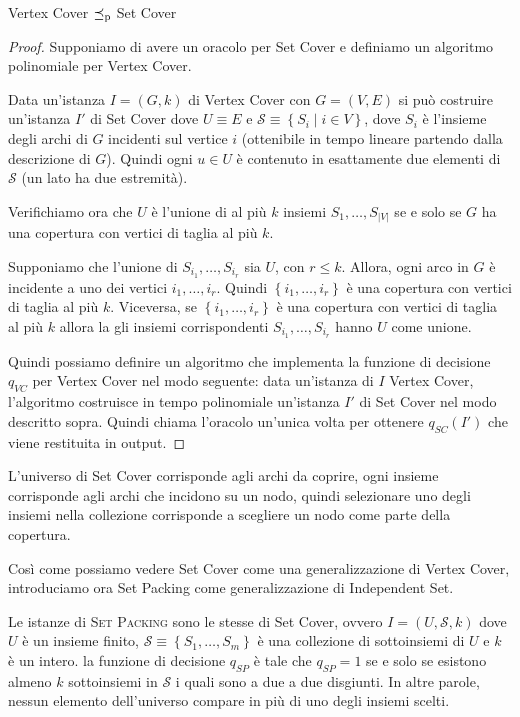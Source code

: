 \begin{fact}
    Vertex Cover $\preceq_\text{p}$ Set Cover
\end{fact}
\begin{proof}
    Supponiamo di avere un oracolo per Set Cover e definiamo un algoritmo polinomiale per Vertex Cover.

    Data un'istanza $I = (G,k)$ di Vertex Cover con $G = (V,E)$ si può costruire un'istanza $I'$ di Set Cover dove $U \equiv E$ e $\mathcal{S} \equiv \left\{S_i \mid i \in V \right\}$, dove $S_i$ è l'insieme degli archi di $G$ incidenti sul vertice $i$ (ottenibile in tempo lineare partendo dalla descrizione di $G$). Quindi ogni $u \in U$ è contenuto in esattamente due elementi di $\mathcal{S}$ (un lato ha due estremità).

    Verifichiamo ora che $U$ è l'unione di al più $k$ insiemi $S_1, \dots, S_{|V|}$ se e solo se $G$ ha una copertura con vertici di taglia al più $k$.

    Supponiamo che l'unione di $S_{i_1}, \dots, S_{i_r}$ sia $U$, con $r \leq k$. Allora, ogni arco in $G$ è incidente a uno dei vertici $i_1, \dots, i_r$. Quindi $\left\{i_1, \dots, i_r\right\}$ è una copertura con vertici di taglia al più $k$. Viceversa, se $\left\{i_1, \dots, i_r\right\}$ è una copertura con vertici di taglia al più $k$ allora la gli insiemi corrispondenti $S_{i_1}, \dots, S_{i_r}$ hanno $U$ come unione.

    Quindi possiamo definire un algoritmo che implementa la funzione di decisione $q_{VC}$ per Vertex Cover nel modo seguente: data un'istanza di $I$ Vertex Cover, l'algoritmo costruisce in tempo polinomiale un'istanza $I'$ di Set Cover nel modo descritto sopra. Quindi chiama l'oracolo un'unica volta per ottenere $q_{SC} (I')$ che viene restituita in output.
\end{proof}

L'universo di Set Cover corrisponde agli archi da coprire, ogni insieme corrisponde agli archi che incidono su un nodo, quindi selezionare uno degli insiemi nella collezione corrisponde a scegliere un nodo come parte della copertura.

Così come possiamo vedere Set Cover come una generalizzazione di Vertex Cover, introduciamo ora Set Packing come generalizzazione di Independent Set.

Le istanze di \textsc{Set Packing} sono le stesse di Set Cover, ovvero $I = (U, \mathcal{S}, k)$ dove $U$ è un insieme finito, $\mathcal{S} \equiv \left\{S_1, \dots, S_m \right\}$ è una collezione di sottoinsiemi di $U$ e $k$ è un intero. la funzione di decisione $q_{SP}$ è tale che $q_{SP} = 1$ se e solo se esistono almeno $k$ sottoinsiemi in $\mathcal{S}$ i quali sono a due a due disgiunti. In altre parole, nessun elemento dell'universo compare in più di uno degli insiemi scelti.

